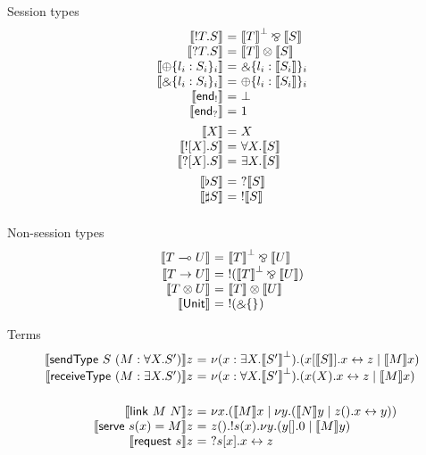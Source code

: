 \documentclass{easychair}
\makeatletter
\newcommand{\ba}{\begin{array}}
\newcommand{\ea}{\end{array}}
\newenvironment{equations}{\[\ba{@{}r@{~}c@{~}l@{}}}{\ea\]}
\newcommand{\key}{\mathsf}
\newcommand{\set}[1]{\{ #1 \}}
\newcommand{\gvtocp}[1]{\llbracket{#1}\rrbracket}
\newcommand{\row}[2]{\set{#1}_{#2}}
\newcommand{\gvOutput}[2]{\mathord{!}{#1}.{#2}}
\newcommand{\gvInput}[2]{\mathord{?}{#1}.{#2}}
\newcommand{\gvEndOutput}{\key{end}_!}
\newcommand{\gvEndInput}{\key{end}_?}
\newcommand{\gvPlus}[2]{\oplus \row{#1}{#2}}
\newcommand{\gvChoice}[2]{\binampersand \row{#1}{#2}}
\newcommand{\gvServer}[1]{\flat {#1}}
\newcommand{\gvService}[1]{\sharp {#1}}
\newcommand{\gvOutputType}[2]{![{#1}].{#2}}
\newcommand{\gvInputType}[2]{?[{#1}].{#2}}
\newcommand{\la}{l}
\newcommand{\lolli}{\multimap}
\newcommand{\gvLinFun}[2]{{#1} \lolli {#2}}
\newcommand{\gvUnFun}[2]{{#1} \to {#2}}
\newcommand{\gvTimes}[2]{{#1} \otimes {#2}}
\newcommand{\gvUnitType}{\key{Unit}}
\newcommand{\gvLink}[2]{\key{link}~{#1}~{#2}}
\newcommand{\gvSendType}[2]{\key{sendType}~{#1}~{#2}}
\newcommand{\gvReceiveType}[1]{\key{receiveType}~{#1}}
\newcommand{\gvServe}[3]{\key{serve}~{#1}({#2})={#3}}
\newcommand{\gvRequest}[1]{\key{request}~{#1}}
\newcommand{\cpLink}[2]{{#1} \leftrightarrow {#2}}
\newcommand{\cpCut}[3]{\nu {#1}.({#2} \mid {#3})}
\newcommand{\cpServe}[3]{!{#1}({#2}).{#3}}
\newcommand{\cpRequest}[3]{?{#1}[{#2}].{#3}}
\newcommand{\cpEmptyOut}[1]{{#1}[].0}
\newcommand{\cpEmptyIn}[2]{{#1}().{#2}}
\newcommand{\cpSendType}[3]{{#1}[{#2}].{#3}}
\newcommand{\cpReceiveType}[3]{{#1}({#2}).{#3}}
\newcommand{\cpTimes}[2]{{#1} \otimes {#2}}
\newcommand{\cpPar}[2]{{#1} \mathbin{\bindnasrepma} {#2}}
\newcommand{\cpPlus}[2]{\oplus \row{#1}{#2}}
\newcommand{\cpWith}[2]{\binampersand \row{#1}{#2}}
\newcommand{\cpOne}{1}
\newcommand{\cpBottom}{\bot}
\newcommand{\cpOfCourse}[1]{!{#1}}
\newcommand{\cpWhyNot}[1]{?{#1}}
\newcommand{\cpDual}[1]{{#1}^\bot}
\newcommand{\cpExists}[2]{\exists {#1}.{#2}}
\newcommand{\cpForall}[2]{\forall {#1}.{#2}}
\makeatother
\begin{document}
Session types
\begin{equations}
\gvtocp{\gvOutput{T}{S}}        &=& \cpPar{\cpDual{\gvtocp{T}}}{\gvtocp{S}} \\
\gvtocp{\gvInput{T}{S}}         &=& \cpTimes{\gvtocp{T}}{\gvtocp{S}} \\
\gvtocp{\gvPlus{\la_i:S_i}{i}}   &=& \cpWith{\la_i:\gvtocp{S_i}}{i} \\
\gvtocp{\gvChoice{\la_i:S_i}{i}} &=& \cpPlus{\la_i:\gvtocp{S_i}}{i} \\
\gvtocp{\gvEndOutput}              &=& \cpBottom \\
\gvtocp{\gvEndInput}               &=& \cpOne \\[1ex]

\gvtocp{X}                       &=& X \\
\gvtocp{\gvOutputType{X}{S}}     &=& \cpForall{X}{\gvtocp{S}} \\
\gvtocp{\gvInputType{X}{S}}      &=& \cpExists{X}{\gvtocp{S}} \\[1ex]

\gvtocp{\gvServer{S}}  &=& \cpWhyNot{\gvtocp{S}} \\
\gvtocp{\gvService{S}} &=& \cpOfCourse{\gvtocp{S}} \\[1ex]
\end{equations}

Non-session types
\begin{equations}
\gvtocp{\gvLinFun{T}{U}} &=& \cpPar{\cpDual{\gvtocp{T}}}{\gvtocp{U}} \\
\gvtocp{\gvUnFun{T}{U}} &=& \cpOfCourse{(\cpPar{\cpDual{\gvtocp{T}}}{\gvtocp{U}})} \\
\gvtocp{\gvTimes{T}{U}} &=& \cpTimes{\gvtocp{T}}{\gvtocp{U}} \\
\gvtocp{\gvUnitType} &=& \cpOfCourse{(\cpWith{}{})} \\
\end{equations}

Terms
\begin{equations}
\gvtocp{\gvSendType{S}{(M : \cpForall{X}{S'})}}z &=&
  \cpCut{(x:\cpExists{X}{\cpDual{\gvtocp{S'}}})}{\cpSendType{x}{\gvtocp{S}}{\cpLink{x}{z}}}{\gvtocp{M}x} \\
\gvtocp{\gvReceiveType{(M : \cpExists{X}{S'})}}z &=&
  \cpCut{(x:\cpForall{X}{\cpDual{\gvtocp{S'}}})}{\cpReceiveType{x}{X}{\cpLink{x}{z}}}{\gvtocp{M}x} \\
\\[1ex]
\gvtocp{\gvLink{M}{N}}z &=& \cpCut{x}{\gvtocp{M}x}{\cpCut{y}{\gvtocp{N}y}{\cpEmptyIn{z}{\cpLink{x}{y}}}} \\
\gvtocp{\gvServe{s}{x}{M}}z &=&
  \cpEmptyIn{z}
            {\cpServe{s}{x}
                     {\cpCut{y}{\cpEmptyOut{y}}{\gvtocp{M}y}}} \\
\gvtocp{\gvRequest{s}}z &=& \cpRequest{s}{x}{\cpLink{x}{z}} \\
\end{equations}
\end{document}
